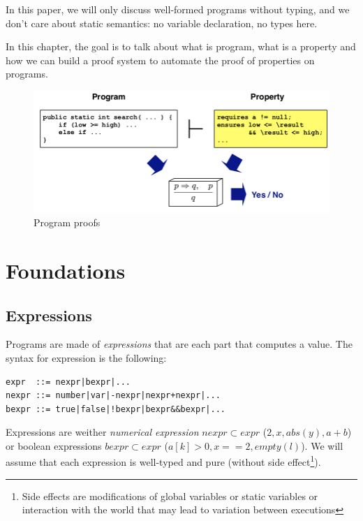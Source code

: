 \documentclass[12pt, a4paper]{book}
\begin{document}
In this paper, we will only discuss well-formed programs without typing, and we
don't care about static semantics: no variable declaration, no types here.
\newline

In this chapter, the goal is to talk about what is program, what is a property
and how we can build a proof system to automate the proof of properties on
programs.

  \begin{figure}[!ht]
      \includegraphics[width=\linewidth]{program_proofs.png}
      \caption{Program proofs}
  \end{figure}
  \section{Foundations}
  \label{sec:Foundations}

\subsection{Expressions}
\label{sub:Expressions}


Programs are made of \textit{expressions} that are each part that computes a
value. The syntax for expression is the following:

\begin{verbatim}
expr  ::= nexpr|bexpr|...
nexpr ::= number|var|-nexpr|nexpr+nexpr|...
bexpr ::= true|false|!bexpr|bexpr&&bexpr|...
\end{verbatim}

Expressions are weither \textit{numerical expression} $nexpr \subset expr$
($2,x, abs(y), a+b$) or boolean expressions $bexpr \subset expr$
($a[k]>0, x==2, empty(l)$). We will assume that each expression is well-typed
and pure (without side effect\footnote{Side effects are modifications of global
variables or static variables or interaction with the world that may lead to
variation between executions}). \newline
\end{document}
